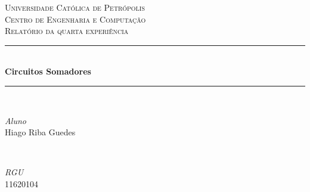 \documentclass[11pt]{article}
\begin{document}

\begin{titlepage} %
	\newcommand{\HRule}{\rule{\linewidth}{0.5mm}} %
	
	\center %
	
	
	\textsc{\LARGE Universidade Católica de Petrópolis}\\[1.5cm] %
	
	\textsc{\Large Centro de Engenharia e Computação}\\[0.5cm] %
	
	\textsc{\large Relatório da quarta experiência}\\[0.5cm] %
	
	
	\HRule\\[0.4cm]
	
	{\huge\bfseries  Circuitos Somadores}\\[0.4cm] %
	
	\HRule\\[1.5cm]
	
	
	\begin{minipage}{0.4\textwidth}
		\begin{flushleft}
			\large
			\textit{Aluno}\\
			Hiago Riba Guedes %
		\end{flushleft}
	\end{minipage}
	~
	\begin{minipage}{0.4\textwidth}
		\begin{flushright}
			\large
			\textit{RGU}\\
			11620104 %
		\end{flushright}
	\end{minipage}
	

\end{titlepage}
\end{document}
